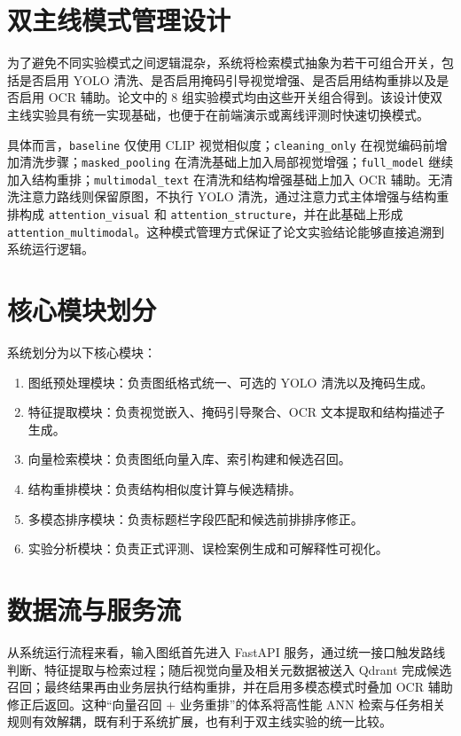 \section{双主线模式管理设计}

为了避免不同实验模式之间逻辑混杂，系统将检索模式抽象为若干可组合开关，包括是否启用 YOLO 清洗、是否启用掩码引导视觉增强、是否启用结构重排以及是否启用 OCR 辅助。论文中的 8 组实验模式均由这些开关组合得到。该设计使双主线实验具有统一实现基础，也便于在前端演示或离线评测时快速切换模式。

具体而言，\texttt{baseline} 仅使用 CLIP 视觉相似度；\texttt{cleaning\_only} 在视觉编码前增加清洗步骤；\texttt{masked\_pooling} 在清洗基础上加入局部视觉增强；\texttt{full\_model} 继续加入结构重排；\texttt{multimodal\_text} 在清洗和结构增强基础上加入 OCR 辅助。无清洗注意力路线则保留原图，不执行 YOLO 清洗，通过注意力式主体增强与结构重排构成 \texttt{attention\_visual} 和 \texttt{attention\_structure}，并在此基础上形成 \texttt{attention\_multimodal}。这种模式管理方式保证了论文实验结论能够直接追溯到系统运行逻辑。

\section{核心模块划分}

系统划分为以下核心模块：

\begin{enumerate}
  \item 图纸预处理模块：负责图纸格式统一、可选的 YOLO 清洗以及掩码生成。
  \item 特征提取模块：负责视觉嵌入、掩码引导聚合、OCR 文本提取和结构描述子生成。
  \item 向量检索模块：负责图纸向量入库、索引构建和候选召回。
  \item 结构重排模块：负责结构相似度计算与候选精排。
  \item 多模态排序模块：负责标题栏字段匹配和候选前排排序修正。
  \item 实验分析模块：负责正式评测、误检案例生成和可解释性可视化。
\end{enumerate}

\section{数据流与服务流}

从系统运行流程来看，输入图纸首先进入 FastAPI 服务，通过统一接口触发路线判断、特征提取与检索过程；随后视觉向量及相关元数据被送入 Qdrant 完成候选召回；最终结果再由业务层执行结构重排，并在启用多模态模式时叠加 OCR 辅助修正后返回。这种“向量召回 + 业务重排”的体系将高性能 ANN 检索与任务相关规则有效解耦，既有利于系统扩展，也有利于双主线实验的统一比较。

